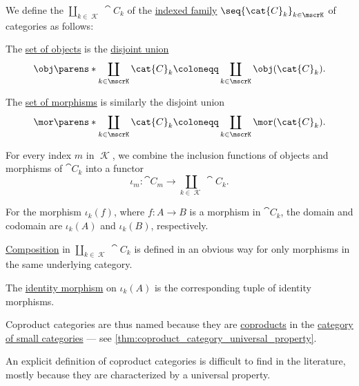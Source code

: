 \begin{definition}\label{def:coproduct_category}\mimprovised
  We define the  \( \coprod_{k \in \mscrK} \cat{C}_k \) of the \hyperref[def:indexed_family]{indexed family} \( \seq{ \cat{C}_k }_{k \in \mscrK} \) of categories as follows:
  \begin{thmenum}
     The \hyperref[def:category/objects]{set of objects} is the \hyperref[def:disjoint_union]{disjoint union}
    \begin{equation*}
      \obj\parens*{ \coprod_{k \in \mscrK} \cat{C}_k } \coloneqq \coprod_{k \in \mscrK} \obj(\cat{C}_k).
    \end{equation*}

     The \hyperref[def:category/morphisms]{set of morphisms} is similarly the disjoint union
    \begin{equation*}
      \mor\parens*{ \coprod_{k \in \mscrK} \cat{C}_k } \coloneqq \coprod_{k \in \mscrK} \mor(\cat{C}_k).
    \end{equation*}

    For every index \( m \) in \( \mscrK \), we combine the inclusion functions of objects and morphisms of \( \cat{C}_k \) into a functor
    \begin{equation*}
      \iota_m: \cat{C}_m \to \coprod_{k \in \mscrK} \cat{C}_k.
    \end{equation*}

    For the morphism \( \iota_k(f) \), where \( f: A \to B \) is a morphism in \( \cat{C}_k \), the domain and codomain are \( \iota_k(A) \) and \( \iota_k(B) \), respectively.

     \hyperref[def:category/composition]{Composition} in \( \coprod_{k \in \mscrK} \cat{C}_k \) is defined in an obvious way for only morphisms in the same underlying category.

     The \hyperref[def:category/identity]{identity morphism} on \( \iota_k(A) \) is the corresponding tuple of identity morphisms.
  \end{thmenum}
\end{definition}
\begin{comments}
  \item Coproduct categories are thus named because they are \hyperref[def:categorical_coproduct]{coproducts} in the \hyperref[def:category_of_small_categories]{category of small categories} --- see \cref{thm:coproduct_category_universal_property}.

  \item An explicit definition of coproduct categories is difficult to find in the literature, mostly because they are characterized by a universal property.
\end{comments}

